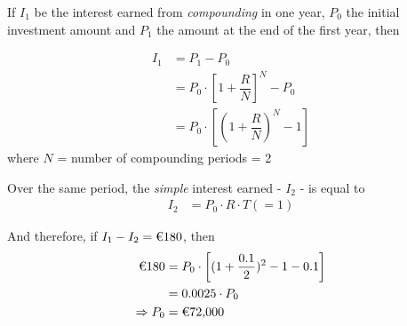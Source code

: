\begin{solution}[\fullpage]
	If $I_1$ be the interest earned from \emph{compounding} in one year, $P_0$ the 
	initial investment amount and $P_1$ the amount at the end of the first year, then
	
	\begin{align}
		I_1 &= P_1 - P_0 \\ 
		    &= P_0\cdot\left[ 1+\dfrac{R}{N}\right]^N - P_0 \\
		    &= P_0\cdot\left[ (1+\dfrac{R}{N})^N - 1 \right]
	\end{align}
	where $N$ = number of compounding periods = 2
	
	Over the same period, the \emph{simple} interest earned - $I_2$ - is equal to
	\begin{align}
		I_2 &= P_0\cdot R\cdot T(=1)
    \end{align}
    
    And therefore, if $I_1-I_2 = \text{\texteuro 180}$, then 
    \begin{align}
    	\text{\texteuro 180} &= P_0\cdot\left[ (1+\dfrac{0.1}{2})^2 - 1 - 0.1\right] \\
    	                     &= 0.0025\cdot P_0 \\
    	\Rightarrow P_0 &= \text{\texteuro 72,000}
    \end{align}
\end{solution}

